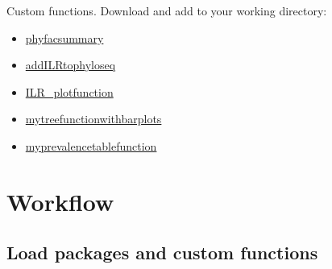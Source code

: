 \documentclass[
]{book}
\providecommand{\tightlist}{%
  \setlength{\itemsep}{0pt}\setlength{\parskip}{0pt}}
\begin{document}
Custom functions. Download and add to your working directory:

\begin{itemize}
\tightlist
\item
  \href{./custom-functions/phyfacsummary.R}{phyfacsummary}\\
\item
  \href{./custom-functions/addILRtophyloseq.R}{addILRtophyloseq}\\
\item
  \href{./custom-functions/ILR_plotfunction.R}{ILR\_plotfunction}\\
\item
  \href{./custom-functions/mytreefunctionwithbarplots.R}{mytreefunctionwithbarplots}\\
\item
  \href{./custom-functions/myprevalencetablefunction.R}{myprevalencetablefunction}
\end{itemize}

\hypertarget{workflow-5}{%
\section{Workflow}\label{workflow-5}}

\hypertarget{load-packages-and-custom-functions}{%
\subsection{Load packages and custom functions}\label{load-packages-and-custom-functions}}
\end{document}
